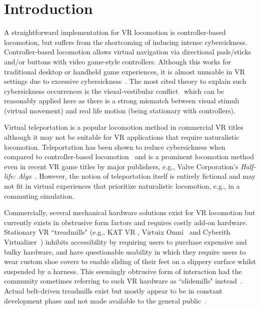 \documentclass[manuscript,review,anonymous]{acmart}
\begin{document}

\section{Introduction}



A straightforward implementation for VR locomotion is controller-based locomotion, but suffers from the shortcoming of inducing intense cybersickness. Controller-based locomotion allows virtual navigation via directional pads/sticks and/or buttons with video game-style controllers. Although this works for traditional desktop or handheld game experiences, it is almost unusable in VR settings due to excessive cybersickness~\cite{controllerCybersickness2014}. The most cited theory to explain such cybersickness occurrences is the visual-vestibular conflict~\cite{visualVestibularConflictVR2020} which can be reasonably applied here as there is a strong mismatch between visual stimuli (virtual movement) and real life motion (being stationary with controllers).

Virtual teleportation is a popular locomotion method in commercial VR titles although it may not be suitable for VR applications that require naturalistic locomotion. Teleportation has been shown to reduce cybersickness when compared to controller-based locomotion~\cite{teleportLessCybersickness2017} and is a prominent locomotion method even in recent VR game titles by major publishers, e.g., Valve Corporation's \emph{Half-life: Alyx}~\cite{halfLifeAlyxonSteam2021}. However, the notion of teleportation itself is entirely fictional and may not fit in virtual experiences that prioritize naturalistic locomotion, e.g., in a commuting simulation.

Commercially, several mechanical hardware solutions exist for VR locomotion but currently exists in obstrusive form factors and requires costly add-on hardware. Stationary VR ``treadmills" (e.g., KAT VR \cite{KATVROfficialSite2021}, Virtuix Omni~\cite{virtuixOmniOfficialSite2021} and Cyberith Virtualizer~\cite{cyberithVirtualizer2021}) inhibits accessibility by requiring users to purchase expensive and bulky hardware, and have questionable usability in which they require users to wear custom shoe covers to enable sliding of their feet on a slippery surface whilst suspended by a harness. This seemingly obtrusive form of interaction had the community sometimes referring to such VR hardware as ``slidemills" instead~\cite{slidemillsAniwaablog2018}. Actual belt-driven treadmills exist but mostly appear to be in constant development phase and not made available to the general public~\cite{infinadeck2021,spaceWalkerVR2021,aperiumRealityK01Pod2021}.
\end{document}

